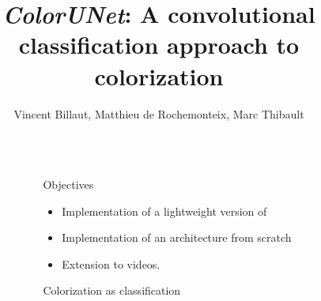 \documentclass[final]{beamer}
\title{\textit{ColorUNet}: A convolutional classification approach to colorization} %
\author{Vincent Billaut, Matthieu de Rochemonteix, Marc Thibault} %
\institute{CS231n Final Project, 03/12/2018} %
\newlength{\sepwid}
\newlength{\onecolwid}
\begin{document}
\small
{} %

\setlength{\belowcaptionskip}{2ex} %
\setlength\belowdisplayshortskip{2ex} %

\begin{frame}[t] %

\begin{columns}[t] %

\begin{column}{\sepwid}\end{column} %

\begin{column}{\onecolwid} %


\begin{alertblock}{Objectives}

\begin{itemize}
\item Implementation of a lightweight version of \cite{zhang2016colorful}
\item Implementation of an architecture from scratch
\item Extension to videos.
\end{itemize}

\end{alertblock}


\begin{block}{Colorization as classification}


\end{block}
\end{column}
\end{columns}
\end{frame}
\end{document}
